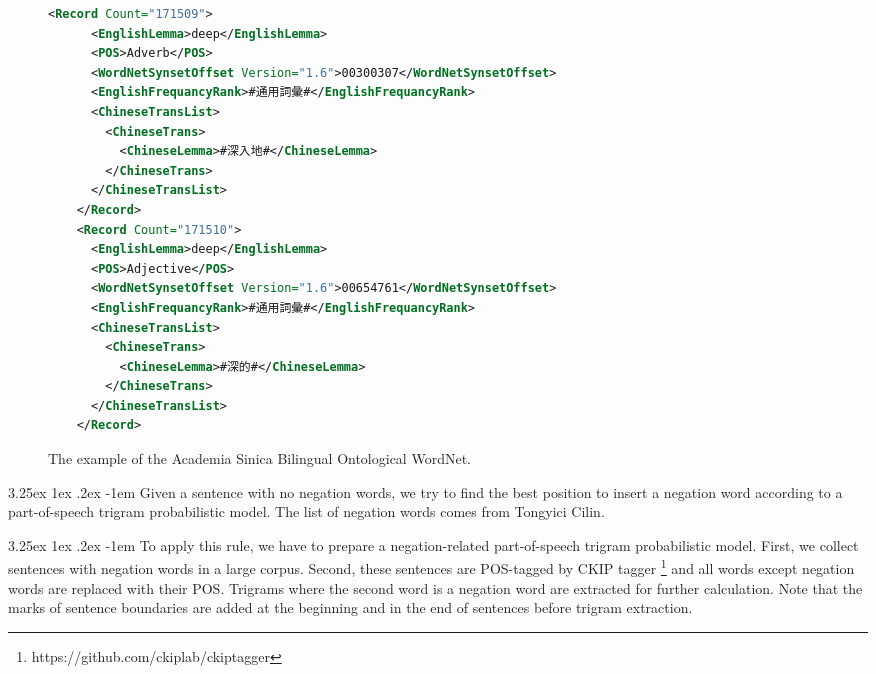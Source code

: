 \documentclass[12pt]{article}
\makeatletter
\newcounter{subsubsubsection}[subsubsection]
\renewcommand\paragraph{\@startsection{paragraph}{5}{\z@}%
  {3.25ex \@plus1ex \@minus.2ex}%
  {-1em}%
  {\normalfont\normalsize\bfseries}}
\makeatother
\begin{document}
\begin{CJK*}{UTF8}{bkai}
\begin{spacing}{1.77}
\begin{figure}
  \centering
  \caption{The example of the Academia Sinica Bilingual Ontological WordNet.}
  \begin{minipage}{\linewidth}
    \begin{lstlisting}[language=XML]
    <Record Count="171509">
      <EnglishLemma>deep</EnglishLemma>
      <POS>Adverb</POS>
      <WordNetSynsetOffset Version="1.6">00300307</WordNetSynsetOffset>
      <EnglishFrequancyRank>#通用詞彙#</EnglishFrequancyRank>
      <ChineseTransList>
        <ChineseTrans>
          <ChineseLemma>#深入地#</ChineseLemma>
        </ChineseTrans>
      </ChineseTransList>
    </Record>
    <Record Count="171510">
      <EnglishLemma>deep</EnglishLemma>
      <POS>Adjective</POS>
      <WordNetSynsetOffset Version="1.6">00654761</WordNetSynsetOffset>
      <EnglishFrequancyRank>#通用詞彙#</EnglishFrequancyRank>
      <ChineseTransList>
        <ChineseTrans>
          <ChineseLemma>#深的#</ChineseLemma>
        </ChineseTrans>
      </ChineseTransList>
    </Record>
    \end{lstlisting}
  \end{minipage}
  \label{fig:bow}
\end{figure}

\paragraph{}
Given a sentence with no negation words, we try to find the best position to insert a negation word according to a part-of-speech trigram probabilistic model. The list of negation words comes from
Tongyici Cilin.

\paragraph{}
To apply this rule, we have to prepare a negation-related part-of-speech trigram probabilistic model. First, we collect sentences with negation words in a large corpus. Second, these sentences are POS-tagged by CKIP tagger \footnote{https://github.com/ckiplab/ckiptagger}\cite{Li_Fu_Ma_2020} and all words except negation words are replaced with their POS. Trigrams where the second word is a negation word are extracted for further calculation. Note that the marks of sentence boundaries are added at the beginning and in the end of sentences before trigram extraction.


\end{spacing}
\end{CJK*}
\end{document}
